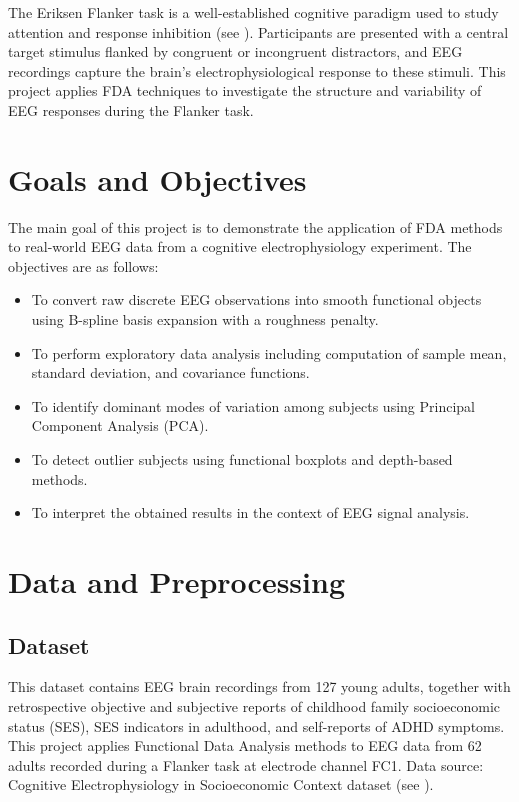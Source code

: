 \documentclass[twoside,11pt]{article}
\begin{document}
The Eriksen Flanker task is a well-established cognitive paradigm used to study attention and
response inhibition (see \cite{Eriksen1974}). Participants are presented with a central target
stimulus flanked by congruent or incongruent distractors, and EEG recordings capture the brain's
electrophysiological response to these stimuli. This project applies FDA techniques to investigate
the structure and variability of EEG responses during the Flanker task.

\section{Goals and Objectives}

The main goal of this project is to demonstrate the application of FDA methods to real-world EEG
data from a cognitive electrophysiology experiment. The objectives are as follows:

\begin{itemize}[
  itemsep=5pt,
  topsep=2pt,
  parsep=0pt,
  partopsep=0pt
]
  \item To convert raw discrete EEG observations into smooth functional objects using B-spline basis
    expansion with a roughness penalty.
  \item To perform exploratory data analysis including computation of sample mean, standard
    deviation, and covariance functions.
  \item To identify dominant modes of variation among subjects using Principal Component Analysis
      (PCA).
  \item To detect outlier subjects using functional boxplots and depth-based methods.
  \item To interpret the obtained results in the context of EEG signal analysis.
\end{itemize}

\section{Data and Preprocessing}

\subsection{Dataset}

This dataset contains EEG brain recordings from 127 young adults, together with retrospective
objective and subjective reports of childhood family socioeconomic status (SES), SES indicators in
adulthood, and self-reports of ADHD symptoms. This project applies Functional Data Analysis methods
to EEG data from 62 adults recorded during a Flanker task at electrode channel FC1. Data source:
Cognitive Electrophysiology in Socioeconomic Context dataset (see \cite{ds006018:1.2.2}).
\end{document}
